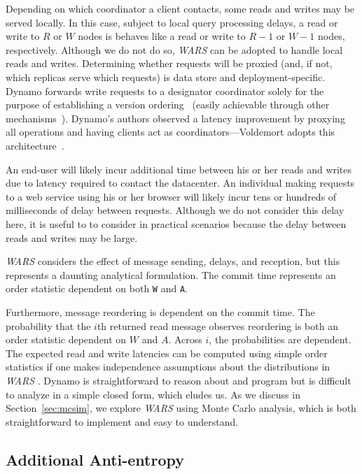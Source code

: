 \documentclass{vldb}
\newcommand{\subsectionskip}{-0em}
\begin{document}
Depending on which coordinator a client contacts, some reads and
writes may be served locally.  In this case, subject to local query
processing delays, a read or write to $R$ or $W$ nodes is behaves like
a read or write to $R-1$ or $W-1$ nodes, respectively.  Although we do
not do so, \textit{WARS} can be adopted to handle local reads and
writes.  Determining whether requests will be proxied (and, if not,
which replicas serve which requests) is data store and
deployment-specific.  Dynamo forwards write requests to a designator
coordinator solely for the purpose of establishing a version
ordering~\cite[Section 6.4]{dynamo} (easily achievable through other
mechanisms~\cite{zookeeper}).  Dynamo's authors observed a latency
improvement by proxying all operations and having clients act as
coordinators---Voldemort adopts this architecture~\cite{voldemortclient}.

An end-user will likely incur additional time between his or her
reads and writes due to latency required to contact the datacenter.
An individual making requests to a web service using his or her
browser will likely incur tens or hundreds of milliseconds of delay
between requests.  Although we do not consider this delay here, it is
useful to to consider in practical scenarios because the delay between
reads and writes may be large.

\textit{WARS} considers the effect of message sending, delays, and
reception, but this represents a daunting analytical formulation.  The
commit time represents an order statistic dependent on both \texttt{W}
and \texttt{A}.  Furthermore, message reordering is
dependent on the commit time.  The probability that the $i$th returned
read message observes reordering is both an order statistic dependent
on $W$ and $A$.  Across $i$, the probabilities are dependent.  The
expected read and write latencies can be computed using simple order
statistics if one makes independence assumptions about the
distributions in \textit{WARS} .  Dynamo is straightforward to reason
about and program but is difficult to analyze in a simple closed form,
which eludes us.  As we discuss in Section~\ref{sec:mcsim}, we explore
\textit{WARS} using Monte Carlo analysis, which is both
straightforward to implement and easy to understand.

\vspace{\subsectionskip}\subsection{Additional Anti-entropy}
\label{sec:anti-entropy}
\end{document}
